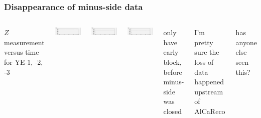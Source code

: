 \documentclass[compress]{beamer}
\begin{document}
\begin{frame}
\frametitle{Disappearance of minus-side data}
\small
\begin{columns}

$Z$ measurement versus time for YE-1, -2, -3

\includegraphics[width=\linewidth]{timeseries_YEm1.pdf}

\includegraphics[width=\linewidth]{timeseries_YEm2.pdf}

\includegraphics[width=\linewidth]{timeseries_YEm3.pdf}


only have early block, before minus-side was closed

\vspace{0.5 cm}
I'm pretty sure the loss of data happened upstream of AlCaReco

\vspace{0.5 cm}
has anyone else seen this?

\end{columns}
\end{frame}
\end{document}
